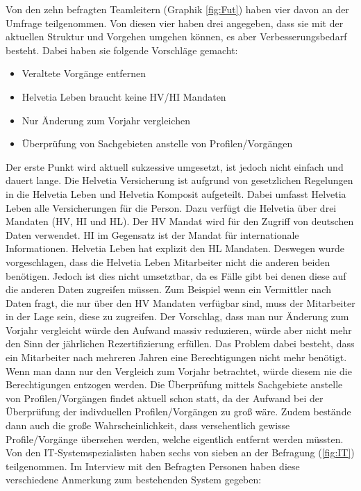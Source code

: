 \newpage
Von den zehn befragten Teamleitern (Graphik \ref{fig:Fut}) haben vier davon an der Umfrage teilgenommen.
Von diesen vier haben drei angegeben, dass sie mit der aktuellen Struktur und Vorgehen umgehen können, es aber Verbesserungsbedarf besteht.
Dabei haben sie folgende Vorschläge gemacht:

\begin{itemize}
	\item Veraltete Vorgänge entfernen
	\item Helvetia Leben braucht keine HV/HI Mandaten
	\item Nur Änderung zum Vorjahr vergleichen
	\item Überprüfung von Sachgebieten anstelle von Profilen/Vorgängen
\end{itemize}

Der erste Punkt wird aktuell sukzessive umgesetzt, ist jedoch nicht einfach und dauert lange.
Die Helvetia Versicherung ist aufgrund von gesetzlichen Regelungen in die Helvetia Leben und Helvetia Komposit aufgeteilt.
Dabei umfasst Helvetia Leben alle Versicherungen für die Person.
Dazu verfügt die Helvetia über drei Mandaten (HV, HI und HL).
Der HV Mandat wird für den Zugriff von deutschen Daten verwendet.
HI im Gegensatz ist der Mandat für internationale Informationen.
Helvetia Leben hat explizit den HL Mandaten.
Deswegen wurde vorgeschlagen, dass die Helvetia Leben Mitarbeiter nicht die anderen beiden benötigen.
Jedoch ist dies nicht umsetztbar, da es Fälle gibt bei denen diese auf die anderen Daten zugreifen müssen.
Zum Beispiel wenn ein Vermittler nach Daten fragt, die nur über den HV Mandaten verfügbar sind, muss der Mitarbeiter in der Lage sein, diese zu zugreifen.
\newline
Der Vorschlag, dass man nur Änderung zum Vorjahr vergleicht würde den Aufwand massiv reduzieren, würde aber nicht mehr den Sinn der jährlichen Rezertifizierung erfüllen.
Das Problem dabei besteht, dass ein Mitarbeiter nach mehreren Jahren eine Berechtigungen nicht mehr benötigt.
Wenn man dann nur den Vergleich zum Vorjahr betrachtet, würde diesem nie die Berechtigungen entzogen werden.
\newline
Die Überprüfung mittels Sachgebiete anstelle von Profilen/Vorgängen findet aktuell schon statt, da der Aufwand bei der Überprüfung der indivduellen Profilen/Vorgängen zu groß wäre.
Zudem bestände dann auch die große Wahrscheinlichkeit, dass versehentlich gewisse Profile/Vorgänge übersehen werden, welche eigentlich entfernt werden müssten.
\newline
\newline
Von den IT-Systemspezialisten haben sechs von sieben an der Befragung (\ref{fig:IT}) teilgenommen.
Im Interview mit den Befragten Personen haben diese verschiedene Anmerkung zum bestehenden System gegeben:

